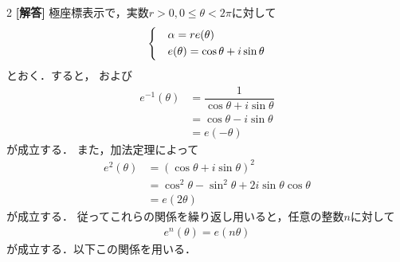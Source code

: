 \documentclass[../../main.tex]{subfiles}
\begin{document}
\setcounter{equation}{0}
\begin{oframed}
  
\end{oframed}
\setlength{\columnseprule}{0.4pt}
\begin{multicols}{2}
  {\bf [解答]}
  極座標表示で，実数$r>0,0\le\theta<2\pi$に対して
  \begin{align}
    \begin{dcases}
      & \alpha=re(\theta)                   \\
      & e(\theta)=\cos \theta + i\sin\theta
    \end{dcases}\label{eq:1}
  \end{align}
  とおく．すると，
  および
  \begin{align}
    e^{-1}(\theta)
    & = \dfrac{1}{\cos \theta + i\sin\theta} \\
    & = \cos\theta -i\sin\theta             \\
    & = e(-\theta)
  \end{align}
  が成立する．
  また，加法定理によって
  \begin{align}
    e^2(\theta)
    & = \left(\cos \theta + i\sin\theta\right) ^2          \\
    & = \cos^2\theta-\sin^2\theta + 2i\sin\theta\cos\theta \\
    & = e(2\theta)
  \end{align}
  が成立する．
  従ってこれらの関係を繰り返し用いると，任意の整数$n$に対して
  \begin{align}
    e^n(\theta) = e(n\theta) \label{eq:2}
  \end{align}
  が成立する．以下この関係を用いる．


\end{multicols}
\end{document}
